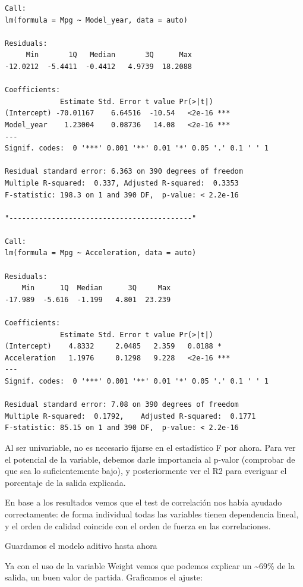 \begin{verbatim}
Call:
lm(formula = Mpg ~ Model_year, data = auto)

Residuals:
     Min       1Q   Median       3Q      Max 
-12.0212  -5.4411  -0.4412   4.9739  18.2088 

Coefficients:
             Estimate Std. Error t value Pr(>|t|)    
(Intercept) -70.01167    6.64516  -10.54   <2e-16 ***
Model_year    1.23004    0.08736   14.08   <2e-16 ***
---
Signif. codes:  0 '***' 0.001 '**' 0.01 '*' 0.05 '.' 0.1 ' ' 1

Residual standard error: 6.363 on 390 degrees of freedom
Multiple R-squared:  0.337, Adjusted R-squared:  0.3353 
F-statistic: 198.3 on 1 and 390 DF,  p-value: < 2.2e-16

"-------------------------------------------"

Call:
lm(formula = Mpg ~ Acceleration, data = auto)

Residuals:
    Min      1Q  Median      3Q     Max 
-17.989  -5.616  -1.199   4.801  23.239 

Coefficients:
             Estimate Std. Error t value Pr(>|t|)    
(Intercept)    4.8332     2.0485   2.359   0.0188 *  
Acceleration   1.1976     0.1298   9.228   <2e-16 ***
---
Signif. codes:  0 '***' 0.001 '**' 0.01 '*' 0.05 '.' 0.1 ' ' 1

Residual standard error: 7.08 on 390 degrees of freedom
Multiple R-squared:  0.1792,    Adjusted R-squared:  0.1771 
F-statistic: 85.15 on 1 and 390 DF,  p-value: < 2.2e-16
\end{verbatim}

Al ser univariable, no es necesario fijarse en el estadístico F por ahora. Para ver el potencial de la variable, debemos darle importancia al p-valor (comprobar de que sea lo suficientemente bajo), y posteriormente ver el R2 para everiguar el porcentaje de la salida explicada.

En base a los resultados vemos que el test de correlación nos había ayudado correctamente: de forma individual todas las variables tienen dependencia lineal, y el orden de calidad coincide con el orden de fuerza en las correlaciones.

Guardamos el modelo aditivo hasta ahora

Ya con el uso de la variable Weight vemos que podemos explicar un \textasciitilde69\% de la salida, un buen valor de partida. Graficamos el ajuste:


